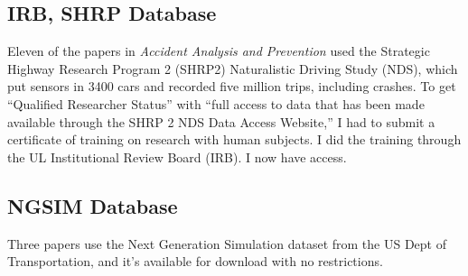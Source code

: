 \subsection{IRB, SHRP Database}

Eleven of the papers in {\it Accident Analysis and Prevention} used the Strategic Highway Research Program 2 (SHRP2) Naturalistic Driving Study (NDS), which put sensors in 3400 cars and recorded five million trips, including crashes.  To get ``Qualified Researcher Status'' with ``full access to data that has been made available through the SHRP 2 NDS Data Access Website,'' I had to submit a certificate of training on research with human subjects.  I did the training through the UL Institutional Review Board (IRB). I now have access.  

\subsection{NGSIM Database}

Three papers use the Next Generation Simulation dataset from the US Dept of Transportation, and it's available for download with no restrictions.  


